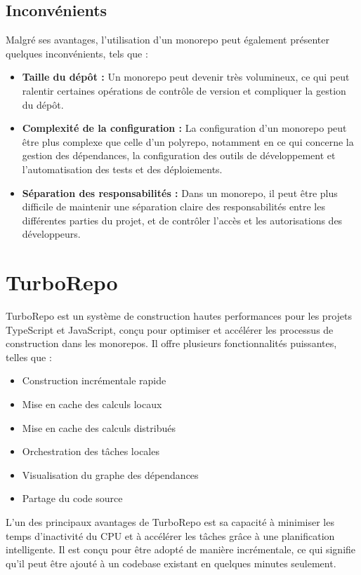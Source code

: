 \subsection{Inconvénients}

Malgré ses avantages, l'utilisation d'un monorepo peut également présenter quelques inconvénients, tels que :

\begin{itemize}
    \item \textbf{Taille du dépôt :} Un monorepo peut devenir très volumineux, ce qui peut ralentir certaines opérations de contrôle de version et compliquer la gestion du dépôt.
    \item \textbf{Complexité de la configuration :} La configuration d'un monorepo peut être plus complexe que celle d'un polyrepo, notamment en ce qui concerne la gestion des dépendances, la configuration des outils de développement et l'automatisation des tests et des déploiements.
    \item \textbf{Séparation des responsabilités :} Dans un monorepo, il peut être plus difficile de maintenir une séparation claire des responsabilités entre les différentes parties du projet, et de contrôler l'accès et les autorisations des développeurs.
\end{itemize}

\section{TurboRepo}

TurboRepo est un système de construction hautes performances pour les projets TypeScript et JavaScript, conçu pour optimiser et accélérer les processus de construction dans les monorepos. Il offre plusieurs fonctionnalités puissantes, telles que :

\begin{itemize}
    \item Construction incrémentale rapide
    \item Mise en cache des calculs locaux
    \item Mise en cache des calculs distribués
    \item Orchestration des tâches locales
    \item Visualisation du graphe des dépendances
    \item Partage du code source
\end{itemize}

L'un des principaux avantages de TurboRepo est sa capacité à minimiser les temps d'inactivité du CPU et à accélérer les tâches grâce à une planification intelligente. Il est conçu pour être adopté de manière incrémentale, ce qui signifie qu'il peut être ajouté à un codebase existant en quelques minutes seulement.

